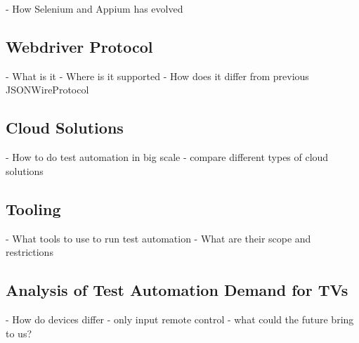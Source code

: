 - How Selenium and Appium has evolved

\subsection{Webdriver Protocol\label{sec:webdriver}}

- What is it
- Where is it supported
- How does it differ from previous JSONWireProtocol

\subsection{Cloud Solutions\label{sec:cloud}}

- How to do test automation in big scale
- compare different types of cloud solutions

\subsection{Tooling\label{sec:tooling}}

- What tools to use to run test automation
- What are their scope and restrictions

\subsection{Analysis of Test Automation Demand for TVs\label{sec:testautomationontv}}

- How do devices differ
- only input remote control
- what could the future bring to us?
